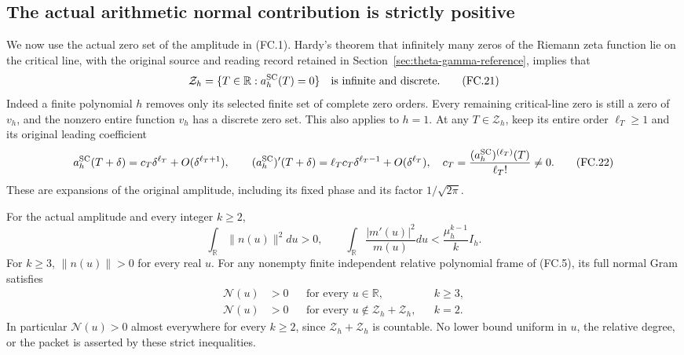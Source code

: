 \subsection{The actual arithmetic normal contribution is strictly positive}

We now use the actual zero set of the amplitude in (FC.1).
Hardy's theorem that infinitely many zeros of the Riemann zeta
function lie on the critical line, with the original source and
reading record retained in Section~\ref{sec:theta-gamma-reference},
implies that
\[
 \mathcal Z_h=\{T\in\mathbb R:a_h^{\rm SC}(T)=0\}
 \quad\hbox{is infinite and discrete.}
 \tag{FC.21}
\]
Indeed a finite polynomial \(h\) removes only its selected finite
set of complete zero orders. Every remaining critical-line zero is
still a zero of \(v_h\), and the nonzero entire function \(v_h\)
has a discrete zero set. This also applies to \(h=1\).
At any \(T\in\mathcal Z_h\), keep its entire order
\(\ell_T\ge1\) and its original leading coefficient
\[
 a_h^{\rm SC}(T+\delta)
       =c_T\delta^{\ell_T}+O(\delta^{\ell_T+1}),\qquad
 (a_h^{\rm SC})'(T+\delta)
       =\ell_Tc_T\delta^{\ell_T-1}+O(\delta^{\ell_T}),
 \quad c_T=\frac{(a_h^{\rm SC})^{(\ell_T)}(T)}{\ell_T!}\ne0.
 \tag{FC.22}
\]
These are expansions of the original amplitude, including its fixed
phase and its factor \(1/\sqrt{2\pi}\).

\begin{theorem}
For the actual amplitude and every integer \(k\ge2\),
\[
 \int_{\mathbb R}\|n(u)\|^2du>0,\qquad
 \boxed{\int_{\mathbb R}\frac{|m'(u)|^2}{m(u)}du
                <\frac{\mu_h^{k-1}}k I_h.}
 \tag{FC.23}
\]
For \(k\ge3\), \(\|n(u)\|>0\) for every real \(u\).
For any nonempty finite independent relative polynomial frame of
(FC.5), its full normal Gram satisfies
\[
 \boxed{\begin{aligned}
  \mathcal N(u)&>0&&\text{for every }u\in\mathbb R,
                                      &&k\ge3,\\
  \mathcal N(u)&>0&&\text{for every }u\notin
                  \mathcal Z_h+\mathcal Z_h,
                                      &&k=2.
 \end{aligned}}
 \tag{FC.24}
\]
In particular \(\mathcal N(u)>0\) almost everywhere for every
\(k\ge2\), since \(\mathcal Z_h+\mathcal Z_h\) is countable.
No lower bound uniform in \(u\), the relative degree, or the
packet is asserted by these strict inequalities.
\end{theorem}

